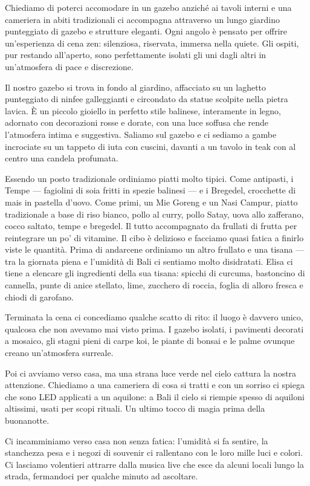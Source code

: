 Chiediamo di poterci accomodare in un gazebo anziché ai tavoli interni e una cameriera in abiti tradizionali ci accompagna attraverso un lungo giardino punteggiato di gazebo e strutture eleganti. Ogni angolo è pensato per offrire un'esperienza di cena zen: silenziosa, riservata, immersa nella quiete. Gli ospiti, pur restando all'aperto, sono perfettamente isolati gli uni dagli altri in un'atmosfera di pace e discrezione.

Il nostro gazebo si trova in fondo al giardino, affacciato su un laghetto punteggiato di ninfee galleggianti e circondato da statue scolpite nella pietra lavica. È un piccolo gioiello in perfetto stile balinese, interamente in legno, adornato con decorazioni rosse e dorate, con una luce soffusa che rende l'atmosfera intima e suggestiva. Saliamo sul gazebo e ci sediamo a gambe incrociate su un tappeto di iuta con cuscini, davanti a un tavolo in teak con al centro una candela profumata.

Essendo un posto tradizionale ordiniamo piatti molto tipici. Come antipasti, i Tempe — fagiolini di soia fritti in spezie balinesi — e i Bregedel, crocchette di mais in pastella d'uovo. Come primi, un Mie Goreng e un Nasi Campur, piatto tradizionale a base di riso bianco, pollo al curry, pollo Satay, uova allo zafferano, cocco saltato, tempe e bregedel. Il tutto accompagnato da frullati di frutta per reintegrare un po' di vitamine. Il cibo è delizioso e facciamo quasi fatica a finirlo viste le quantità. Prima di andarcene ordiniamo un altro frullato e una tisana — tra la giornata piena e l'umidità di Bali ci sentiamo molto disidratati. Elisa ci tiene a elencare gli ingredienti della sua tisana: spicchi di curcuma, bastoncino di cannella, punte di anice stellato, lime, zucchero di roccia, foglia di alloro fresca e chiodi di garofano.

Terminata la cena ci concediamo qualche scatto di rito: il luogo è davvero unico, qualcosa che non avevamo mai visto prima. I gazebo isolati, i pavimenti decorati a mosaico, gli stagni pieni di carpe koi, le piante di bonsai e le palme ovunque creano un'atmosfera surreale.

Poi ci avviamo verso casa, ma una strana luce verde nel cielo cattura la nostra attenzione. Chiediamo a una cameriera di cosa si tratti e con un sorriso ci spiega che sono LED applicati a un aquilone: a Bali il cielo si riempie spesso di aquiloni altissimi, usati per scopi rituali. Un ultimo tocco di magia prima della buonanotte.

Ci incamminiamo verso casa non senza fatica: l'umidità si fa sentire, la stanchezza pesa e i negozi di souvenir ci rallentano con le loro mille luci e colori. Ci lasciamo volentieri attrarre dalla musica live che esce da alcuni locali lungo la strada, fermandoci per qualche minuto ad ascoltare.

